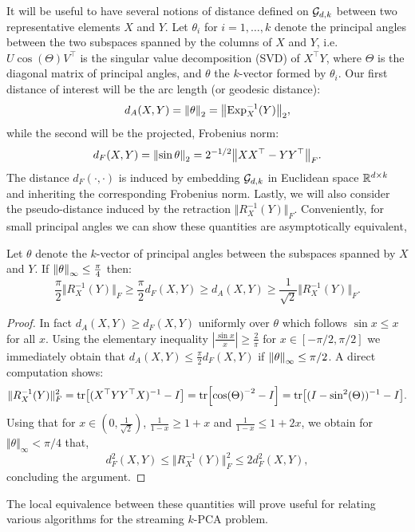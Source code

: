 It will be useful to have several notions of distance defined on $\mathcal{G}_{d,k}$ between two representative elements $X$ and $Y$.
Let $\theta_i$ for $i=1, \hdots, k$ denote the principal angles between the two subspaces spanned by the columns of $X$ and $Y$, i.e.
$U \cos(\Theta) V^\top$ is the singular value decomposition (SVD) of $X^\top Y$, where $\Theta$ is the diagonal matrix of principal angles,
and $\theta$ the $k$-vector formed by $\theta_i$. Our first distance of interest will be the arc length (or geodesic distance):
\[
  d_A(X, Y) = \norm{\theta}_2 = \norm{\Exp^{-1}_{X}(Y)}_2,
\]
while the second will be the projected, Frobenius norm:
\[
    d_F(X, Y) = \norm{\sin \theta}_2 = 2^{-1/2} \norm{X X^\top - Y Y^\top}_{F}.
\]
The distance $d_F(\cdot, \cdot)$ is induced by embedding $\mathcal{G}_{d,k}$ in Euclidean space $\mathbb{R}^{d \times k}$ and inheriting the corresponding Frobenius norm. Lastly, we will also consider the pseudo-distance induced by the retraction $\Vert R^{-1}_{X}(Y)\Vert_F$. Conveniently, for small principal angles we can show these quantities are asymptotically equivalent,
\begin{lemma}
 \label{lem:distequiv}
  Let $\theta$ denote the $k$-vector of principal angles between the subspaces spanned by $X$ and $Y$. If
  $\norm{\theta}_{\infty} \leq \frac{\pi}{4}$ then:
  \[
   \frac{\pi}{2}  \Vert R^{-1}_{X}(Y)\Vert_F \geq \frac{\pi}{2}   d_{F}(X, Y) \geq  d_{A}(X, Y) \geq \frac{1}{\sqrt{2}}  \Vert R^{-1}_{X}(Y)\Vert_F. \]
\end{lemma}
\begin{proof}
  In fact $d_{A}(X, Y) \geq d_{F}(X, Y)$ uniformly over $\theta$ which follows $\sin x \leq x$ for all $x$. Using the elementary inequality $|\frac{\sin x}{x}| \geq \frac{2}{\pi}$ for $x \in [-\pi/2, \pi/2]$ we immediately obtain that $d_{A}(X, Y) \leq \frac{\pi}{2} d_{F}(X, Y)$ if $\norm{\theta}_{\infty} \leq \pi/2$.
A direct computation shows:
\[
\Vert R^{-1}_{X}(Y)\Vert^2_F = \tr[ (X^\top YY^\top X)^{-1}-I]=  \tr[ \cos(\Theta)^{-2}-I]=\tr[ (I-\sin^2(\Theta))^{-1}-I].
\]
Using that for $x\in(0,\frac{1}{\sqrt{2}})$, $\frac{1}{1-x}\geq 1+x$ and $\frac{1}{1-x}\leq 1+2x$, we obtain for $\Vert \theta \Vert_\infty<\pi/4$ that,
\[
d^2_{F}(X, Y)\leq \Vert R^{-1}_{X}(Y)\Vert^2_F \leq 2d^2_{F}(X, Y),\]
concluding the argument.
\end{proof}
The local equivalence between these quantities will prove useful for relating various algorithms for the
streaming $k$-PCA problem.

